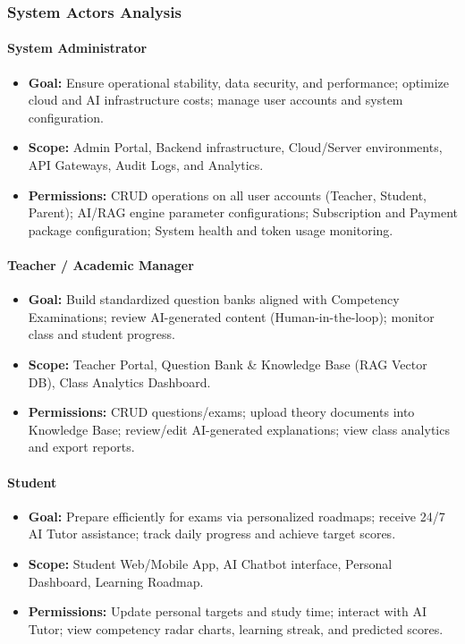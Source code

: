 \documentclass[12pt,a4paper]{article}
\begin{document}
\subsubsection{System Actors Analysis}

\paragraph{System Administrator}
\begin{itemize}[leftmargin=1.5em, itemsep=0.2em]
    \item \textbf{Goal:} Ensure operational stability, data security, and performance; optimize cloud and AI infrastructure costs; manage user accounts and system configuration.
    \item \textbf{Scope:} Admin Portal, Backend infrastructure, Cloud/Server environments, API Gateways, Audit Logs, and Analytics.
    \item \textbf{Permissions:} CRUD operations on all user accounts (Teacher, Student, Parent); AI/RAG engine parameter configurations; Subscription and Payment package configuration; System health and token usage monitoring.
\end{itemize}

\paragraph{Teacher / Academic Manager}
\begin{itemize}[leftmargin=1.5em, itemsep=0.2em]
    \item \textbf{Goal:} Build standardized question banks aligned with Competency Examinations; review AI-generated content (Human-in-the-loop); monitor class and student progress.
    \item \textbf{Scope:} Teacher Portal, Question Bank \& Knowledge Base (RAG Vector DB), Class Analytics Dashboard.
    \item \textbf{Permissions:} CRUD questions/exams; upload theory documents into Knowledge Base; review/edit AI-generated explanations; view class analytics and export reports.
\end{itemize}

\paragraph{Student}
\begin{itemize}[leftmargin=1.5em, itemsep=0.2em]
    \item \textbf{Goal:} Prepare efficiently for exams via personalized roadmaps; receive 24/7 AI Tutor assistance; track daily progress and achieve target scores.
    \item \textbf{Scope:} Student Web/Mobile App, AI Chatbot interface, Personal Dashboard, Learning Roadmap.
    \item \textbf{Permissions:} Update personal targets and study time; interact with AI Tutor; view competency radar charts, learning streak, and predicted scores.
\end{itemize}
\end{document}
